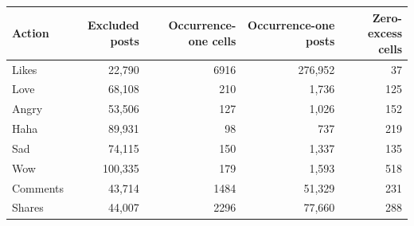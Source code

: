 \begin{tabular}{lrrrr}
\toprule
Action & Excluded posts & Occurrence-one cells & Occurrence-one posts & Zero-excess cells \\
\midrule
Likes & 22,790 & 6916 & 276,952 & 37 \\
Love & 68,108 & 210 & 1,736 & 125 \\
Angry & 53,506 & 127 & 1,026 & 152 \\
Haha & 89,931 & 98 & 737 & 219 \\
Sad & 74,115 & 150 & 1,337 & 135 \\
Wow & 100,335 & 179 & 1,593 & 518 \\
Comments & 43,714 & 1484 & 51,329 & 231 \\
Shares & 44,007 & 2296 & 77,660 & 288 \\
\bottomrule
\end{tabular}
